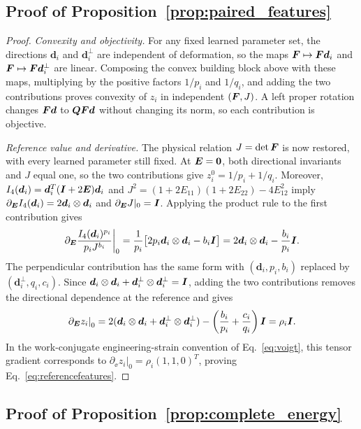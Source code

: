 \subsection{Proof of Proposition~\ref{prop:paired_features}}
\begin{proof}
\emph{Convexity and objectivity.}
For any fixed learned parameter set, the directions $\bm d_i$ and $\bm d_i^\perp$ are independent of deformation, so the maps $\bm F\mapsto\bm F\bm d_i$ and $\bm F\mapsto\bm F\bm d_i^\perp$ are linear. Composing the convex building block above with these maps, multiplying by the positive factors $1/p_i$ and $1/q_i$, and adding the two contributions proves convexity of $z_i$ in independent $(\bm F,J)$. A left proper rotation changes $\bm F\bm d$ to $\bm Q\bm F\bm d$ without changing its norm, so each contribution is objective.

\emph{Reference value and derivative.}
The physical relation $J=\det\bm F$ is now restored, with every learned parameter still fixed. At $\bm E=\bm0$, both directional invariants and $J$ equal one, so the two contributions give $z_i^0=1/p_i+1/q_i$. Moreover, $I_4(\bm d_i)=\bm d_i^T(\bm I+2\bm E)\bm d_i$ and $J^2=(1+2E_{11})(1+2E_{22})-4E_{12}^2$ imply $\partial_{\bm E}I_4(\bm d_i)=2\bm d_i\otimes\bm d_i$ and $\partial_{\bm E}J|_0=\bm I$. Applying the product rule to the first contribution gives
\begin{equation}
 \left.\partial_{\bm E}\frac{I_4(\bm d_i)^{p_i}}{p_iJ^{b_i}}\right|_0
 =\frac1{p_i}\bigl[2p_i\bm d_i\otimes\bm d_i-b_i\bm I\bigr]
 =2\bm d_i\otimes\bm d_i-\frac{b_i}{p_i}\bm I.
\end{equation}
The perpendicular contribution has the same form with $(\bm d_i,p_i,b_i)$ replaced by $(\bm d_i^\perp,q_i,c_i)$. Since $\bm d_i\otimes\bm d_i+\bm d_i^\perp\otimes\bm d_i^\perp=\bm I$, adding the two contributions removes the directional dependence at the reference and gives
\begin{equation}
 \left.\partial_{\bm E}z_i\right|_0
 =2(\bm d_i\otimes\bm d_i+\bm d_i^\perp\otimes\bm d_i^\perp)
 -\left(\frac{b_i}{p_i}+\frac{c_i}{q_i}\right)\bm I
 =\rho_i\bm I.
\end{equation}
In the work-conjugate engineering-strain convention of Eq.~\eqref{eq:voigt}, this tensor gradient corresponds to $\partial_{\ee}z_i|_0=\rho_i(1,1,0)^T$, proving Eq.~\eqref{eq:referencefeatures}.
\end{proof}

\subsection{Proof of Proposition~\ref{prop:complete_energy}}
\label{app:complete_energy_proof}

